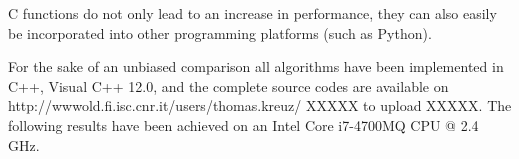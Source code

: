 \documentclass[10pt,twocolumn]{elsart5p}
\begin{document}
C functions do not only lead to an increase in performance, they can also easily be incorporated into other programming platforms (such as Python).




For the sake of an unbiased comparison all algorithms have been implemented in C++, Visual C++ 12.0, and the complete source codes are available on http://wwwold.fi.isc.cnr.it/users/thomas.kreuz/ XXXXX to upload XXXXX. The following results have been achieved on an Intel Core i7-4700MQ CPU @ 2.4 GHz.
\end{document}
